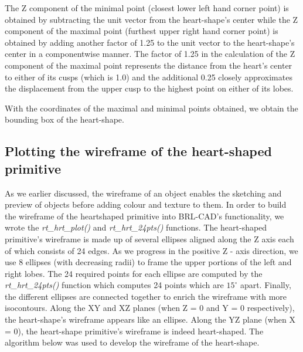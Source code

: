 \hspace{30} The   Z component   of   the   minimal   point   (closest   lower   left   hand   corner   point)   is  
obtained   by   subtracting   the   unit   vector   from   the   heart-­shape's   center   while   the   Z  
component   of   the   maximal   point   (furthest   upper   right   hand   corner   point)   is  
obtained   by   adding   another   factor   of   1.25   to   the   unit   vector   to   the   heart­-shape's  
center   in   a   component­wise   manner.   The   factor   of   1.25   in   the   calculation   of   the  
Z   component   of   the   maximal   point   represents   the   distance   from   the   heart's  
center   to   either   of   its   cusps   (which   is   1.0)   and   the   additional   0.25   closely  
approximates   the   displacement   from   the   upper   cusp   to   the   highest   point   on  
either   of   its   lobes.

With   the   coordinates   of   the   maximal   and   minimal   points  
obtained, we obtain the bounding box of the heart-­shape.  

\subsection{Plotting the wireframe of the heart-­shaped primitive}

\hspace{30} As   we   earlier   discussed,   the   wireframe   of   an   object   enables   the  
sketching   and   preview   of   objects   before   adding   colour   and   texture   to   them.   In  
order   to   build   the   wireframe   of   the   heart­shaped   primitive   into   BRL-­CAD's  
functionality,   we   wrote   the   \textit{rt\_hrt\_plot()}   and   \textit{rt\_hrt\_24pts()}   functions.   The  
heart-­shaped   primitive's   wireframe   is   made   up   of   several   ellipses   aligned   along  
the   Z   axis   each   of   which   consists   of   24   edges.   As   we   progress   in   the   positive  
 Z - ­axis   direction,   we   use   8   ellipses   (with   decreasing   radii)   to   frame   the   upper  
portions   of   the   left   and   right   lobes.   The   24   required   points   for   each   ellipse   are  
computed   by   the   \textit{rt\_hrt\_24pts()} function which computes 24 points which are $15^{\circ}$ apart.
Finally,   the   different   ellipses   are  connected   together   to   enrich   the   wireframe   
with   more   iso­contours.   Along   the  XY   and   XZ   planes   (when   Z   =   0   and   Y   =   0   respectively), the   heart-­shape's  wireframe   appears   like   an   ellipse.   Along   the   YZ   plane   (when   X   =   0),   the  
heart-­shape   primitive's   wireframe   is   indeed   heart­-shaped.   The   algorithm   below  
was used to develop the wireframe of the heart­-shape.  


